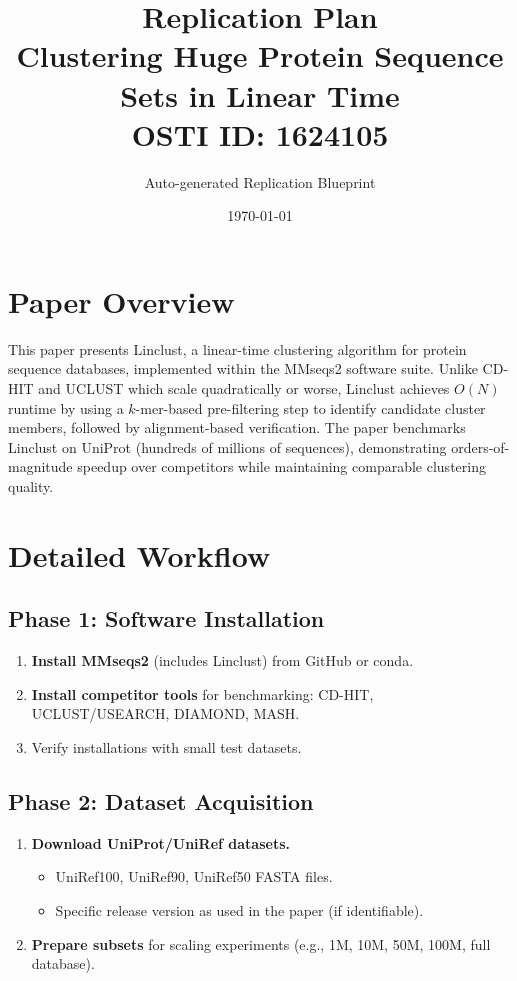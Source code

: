 \documentclass[11pt,a4paper]{article}
\title{\textbf{Replication Plan}\\[0.5em]
\large Clustering Huge Protein Sequence Sets in Linear Time\\[0.3em]
\normalsize OSTI ID: 1624105}
\author{Auto-generated Replication Blueprint}
\date{\today}
\begin{document}
\maketitle
\tableofcontents
\newpage

\section{Paper Overview}
This paper presents Linclust, a linear-time clustering algorithm for protein sequence databases, implemented within the MMseqs2 software suite. Unlike CD-HIT and UCLUST which scale quadratically or worse, Linclust achieves $O(N)$ runtime by using a $k$-mer-based pre-filtering step to identify candidate cluster members, followed by alignment-based verification. The paper benchmarks Linclust on UniProt (hundreds of millions of sequences), demonstrating orders-of-magnitude speedup over competitors while maintaining comparable clustering quality.

\section{Detailed Workflow}

\subsection{Phase 1: Software Installation}
\begin{enumerate}[label=\textbf{1.\arabic*}]
  \item \textbf{Install MMseqs2} (includes Linclust) from GitHub or conda.
  \item \textbf{Install competitor tools} for benchmarking: CD-HIT, UCLUST/USEARCH, DIAMOND, MASH.
  \item Verify installations with small test datasets.
\end{enumerate}

\subsection{Phase 2: Dataset Acquisition}
\begin{enumerate}[label=\textbf{2.\arabic*}]
  \item \textbf{Download UniProt/UniRef datasets.}
    \begin{itemize}
      \item UniRef100, UniRef90, UniRef50 FASTA files.
      \item Specific release version as used in the paper (if identifiable).
    \end{itemize}
  \item \textbf{Prepare subsets} for scaling experiments (e.g., 1M, 10M, 50M, 100M, full database).
\end{enumerate}
\end{document}
